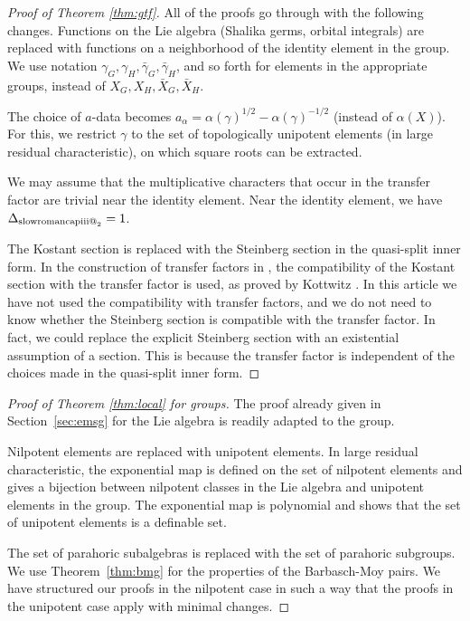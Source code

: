 \documentclass[12pt]{amsart}
\makeatletter
\newcommand*{\rom}[1]{\text{\expandafter\@slowromancap\romannumeral #1@}}
\theoremstyle{plain}
\theoremstyle{definition}
\makeatother
\begin{document}
\begin{proof}[Proof of Theorem \ref{thm:gtf}]
  All of the proofs go through with the following changes.  Functions
  on the Lie algebra (Shalika germs, orbital integrals) are replaced
  with functions on a neighborhood of the identity element in the
  group.  We use notation $\gamma_G,\gamma_H,\bar \gamma_G,\bar
  \gamma_H$, and so forth for elements in the appropriate groups,
  instead of $X_G,X_H,\bar X_G,\bar X_H$.

The choice of $a$-data becomes $a_\alpha = \alpha(\gamma)^{1/2} -
\alpha(\gamma)^{-1/2}$ (instead of $\alpha(X)$).  For this, we
restrict $\gamma$ to the set of topologically unipotent elements (in large
residual characteristic), on which square roots can be extracted.

We may assume that the multiplicative characters that occur in the
transfer factor are trivial near the identity element. Near the identity element,
we have $\Delta_{\rom{3}_2}=1$.

The Kostant section is replaced with the Steinberg section in the
quasi-split inner form.  In the construction of transfer factors in
\cite{CHL}, the compatibility of the Kostant section with the transfer
factor is used, as proved by Kottwitz \cite{Kott}.  In this article we
have not used the compatibility with transfer factors, and we do not
need to know whether the Steinberg section is compatible with the
transfer factor.  In fact, we could replace the explicit Steinberg
section with an existential assumption of a section.  This is because
the transfer factor is independent of the choices made in the
quasi-split inner form.
\end{proof}

\begin{proof}[Proof of Theorem \ref{thm:local} for groups] 
  The proof already given in Section~\ref{sec:emsg} for the Lie
  algebra is readily adapted to the group.

  Nilpotent elements are replaced with unipotent elements.  In large
  residual characteristic, the exponential map is defined on the set
  of nilpotent elements and gives a bijection between nilpotent
  classes in the Lie algebra and unipotent elements in the group.  The
  exponential map is polynomial and shows that the set of unipotent
  elements is a definable set.

  The set of parahoric subalgebras is replaced with the set of parahoric
  subgroups.  We use Theorem~\ref{thm:bmg} for the properties of the
  Barbasch-Moy pairs.  We have structured our proofs in the nilpotent
  case in such a way that the proofs in the unipotent case apply
  with minimal changes.
\end{proof}
\end{document}
